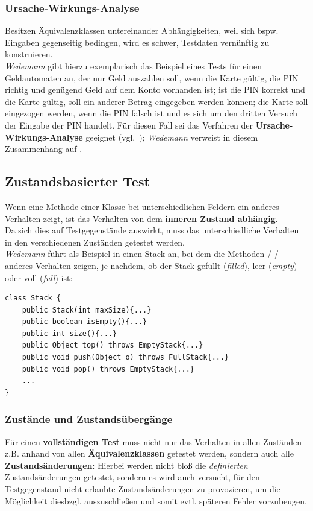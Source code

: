 \subsubsection*{Ursache-Wirkungs-Analyse}
Besitzen Äquivalenzklassen untereinander Abhängigkeiten, weil sich bspw. Eingaben gegenseitig bedingen, wird es schwer, Testdaten vernünftig zu konstruieren.\\
\textit{Wedemann} gibt hierzu exemplarisch das Beispiel eines Tests für einen Geldautomaten an, der nur Geld auszahlen soll, wenn die Karte gültig, die PIN richtig und genügend Geld auf dem Konto vorhanden ist; ist die PIN korrekt und die Karte gültig, soll ein anderer Betrag eingegeben werden können; die Karte soll eingezogen werden, wenn die PIN falsch ist und es sich um den dritten Versuch der Eingabe der PIN handelt. Für diesen Fall sei das Verfahren der \textbf{Ursache-Wirkungs-Analyse} geeignet (vgl.~\cite[46]{Wed09c}); \textit{Wedemann} verweist in diesem Zusammenhang auf \cite{ST05}.


\subsection{Zustandsbasierter Test}\label{subsec:zustandsbasierter-test}
Wenn eine Methode einer Klasse bei unterschiedlichen Feldern ein anderes Verhalten zeigt, ist das Verhalten von dem \textbf{inneren Zustand abhängig}.\\
Da sich dies auf Testgegenstände auswirkt, muss das unterschiedliche Verhalten in den verschiedenen Zuständen getestet werden.\\
\textit{Wedemann} führt als Beispiel in \cite[46 ff.]{Wed09c} einen Stack an, bei dem die Methoden  /  /  anderes Verhalten zeigen, je nachdem, ob der Stack gefüllt (\textit{filled}), leer (\textit{empty}) oder voll (\textit{full}) ist:

\begin{verbatim}
class Stack {
    public Stack(int maxSize){...}
    public boolean isEmpty(){...}
    public int size(){...}
    public Object top() throws EmptyStack{...}
    public void push(Object o) throws FullStack{...}
    public void pop() throws EmptyStack{...}
    ...
}
\end{verbatim}

\subsubsection*{Zustände und Zustandsübergänge}
Für einen \textbf{vollständigen Test} muss nicht nur das Verhalten in allen Zuständen z.B. anhand von allen \textbf{Äquivalenzklassen} getestet werden, sondern auch alle \textbf{Zustandsänderungen}: Hierbei werden nicht bloß die \textit{definierten} Zustandsänderungen getestet, sondern es wird auch versucht, für den Testgegenstand nicht erlaubte Zustandsänderungen zu provozieren, um die Möglichkeit diesbzgl. auszuschließen und somit evtl. späteren Fehler vorzubeugen. \\

